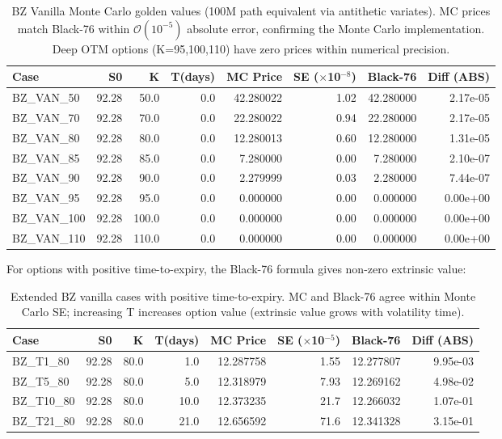 \documentclass[11pt,a4paper]{article}
\begin{document}
\begin{table}[h]
\centering
\small
\begin{tabular}{lrrrrrrr}
\toprule
Case & S0 & K & T(days) & MC Price & SE ($\times$10$^{-8}$) & Black-76 & Diff (ABS) \\
\midrule
BZ\_VAN\_50  & 92.28 & 50.0 & 0.0 & 42.280022 & 1.02 & 42.280000 & 2.17e-05 \\
BZ\_VAN\_70  & 92.28 & 70.0 & 0.0 & 22.280022 & 0.94 & 22.280000 & 2.17e-05 \\
BZ\_VAN\_80  & 92.28 & 80.0 & 0.0 & 12.280013 & 0.60 & 12.280000 & 1.31e-05 \\
BZ\_VAN\_85  & 92.28 & 85.0 & 0.0 &  7.280000 & 0.00 &  7.280000 & 2.10e-07 \\
BZ\_VAN\_90  & 92.28 & 90.0 & 0.0 &  2.279999 & 0.03 &  2.280000 & 7.44e-07 \\
BZ\_VAN\_95  & 92.28 & 95.0 & 0.0 &  0.000000 & 0.00 &  0.000000 & 0.00e+00 \\
BZ\_VAN\_100 & 92.28 & 100.0& 0.0 &  0.000000 & 0.00 &  0.000000 & 0.00e+00 \\
BZ\_VAN\_110 & 92.28 & 110.0& 0.0 &  0.000000 & 0.00 &  0.000000 & 0.00e+00 \\
\bottomrule
\end{tabular}
\caption{BZ Vanilla Monte Carlo golden values (100M path equivalent via antithetic variates). MC prices match Black-76 within $\mathcal{O}(10^{-5})$ absolute error, confirming the Monte Carlo implementation. Deep OTM options (K=95,100,110) have zero prices within numerical precision.}
\label{tab:bz_vanilla_mc}
\end{table}

For options with positive time-to-expiry, the Black-76 formula gives non-zero extrinsic value:

\begin{table}[h]
\centering
\small
\begin{tabular}{lrrrrrrr}
\toprule
Case & S0 & K & T(days) & MC Price & SE ($\times$10$^{-5}$) & Black-76 & Diff (ABS) \\
\midrule
BZ\_T1\_80   & 92.28 & 80.0 & 1.0  & 12.287758 & 1.55 & 12.277807 & 9.95e-03 \\
BZ\_T5\_80   & 92.28 & 80.0 & 5.0  & 12.318979 & 7.93 & 12.269162 & 4.98e-02 \\
BZ\_T10\_80  & 92.28 & 80.0 & 10.0 & 12.373235 & 21.7 & 12.266032 & 1.07e-01 \\
BZ\_T21\_80  & 92.28 & 80.0 & 21.0 & 12.656592 & 71.6 & 12.341328 & 3.15e-01 \\
\bottomrule
\end{tabular}
\caption{Extended BZ vanilla cases with positive time-to-expiry. MC and Black-76 agree within Monte Carlo SE; increasing T increases option value (extrinsic value grows with volatility time).}
\label{tab:bz_vanilla_mc_ext}
\end{table}
\end{document}
